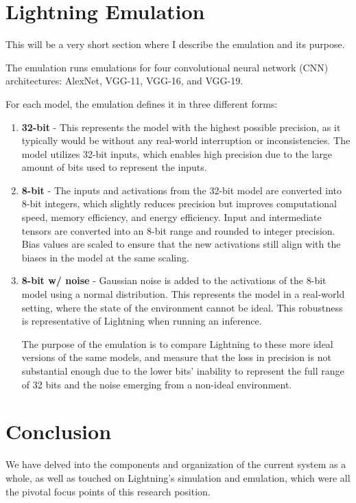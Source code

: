 \documentclass[11pt]{article}
\begin{document}
\section{Lightning Emulation}

This will be a very short section where I describe the emulation and its purpose.

The emulation runs emulations for four convolutional neural network (CNN) architectures: AlexNet, VGG-11, VGG-16, and VGG-19.

For each model, the emulation defines it in three different forms:
\begin{enumerate}
    \item \textbf{32-bit} - This represents the model with the highest possible precision, as it typically would be without any real-world interruption or inconsistencies. The model utilizes 32-bit inputs, which enables high precision due to the large amount of bits used to represent the inputs.
    \item \textbf{8-bit} - The inputs and activations from the 32-bit model are converted into 8-bit integers, which slightly reduces precision but improves computational speed, memory efficiency, and energy efficiency. Input and intermediate tensors are converted into an 8-bit range and rounded to integer precision. Bias values are scaled to ensure that the new activations still align with the biases in the model at the same scaling.
    \item \textbf{8-bit w/ noise} - Gaussian noise is added to the activations of the 8-bit model using a normal distribution. This represents the model in a real-world setting, where the state of the environment cannot be ideal. This robustness is representative of Lightning when running an inference.

The purpose of the emulation is to compare Lightning to these more ideal versions of the same models, and measure that the loss in precision is not substantial enough due to the lower bits' inability to represent the full range of 32 bits and the noise emerging from a non-ideal environment.

\end{enumerate}

\section{Conclusion}

We have delved into the components and organization of the current system as a whole, as well as touched on Lightning's simulation and emulation, which were all the pivotal focus points of this research position.
\end{document}
